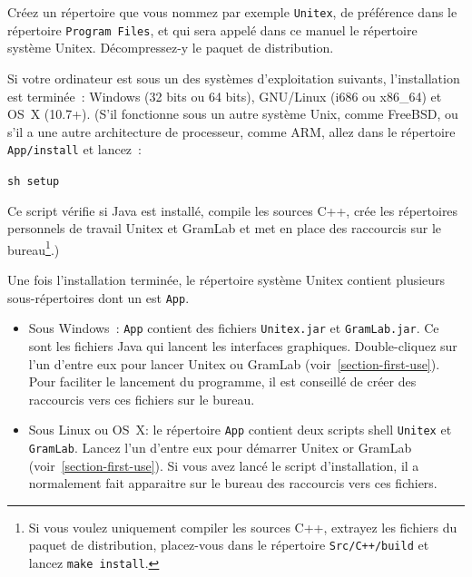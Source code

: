 \noindent  Créez un répertoire que vous nommez par exemple {\tt Unitex\UnitexVersion{}},
de préférence dans le répertoire  \verb+Program Files+, et qui sera appelé dans ce manuel
le répertoire système Unitex. Décompressez-y le paquet de distribution.

\bigskip
\noindent Si votre ordinateur est sous un des systèmes d'exploitation suivants, l'installation est terminée~:
Windows (32 bits ou 64 bits), GNU/Linux (i686 ou x86\_64) et OS~X (10.7+). (S'il fonctionne sous un autre système Unix, comme
FreeBSD, ou s'il a une autre architecture de processeur, comme ARM, allez dans le répertoire \verb+App/install+ et lancez~:

\begin{flushleft}
\verb+sh setup+
\end{flushleft}

\noindent Ce script vérifie si Java est installé, compile les sources C++, crée les répertoires personnels de travail
Unitex et GramLab et met en place des raccourcis sur le bureau\footnote{ Si vous voulez uniquement compiler les sources C++,
extrayez les fichiers du paquet de distribution, placez-vous dans le répertoire {\tt Src/C++/build} et lancez {\tt make install}.}.)

\bigskip
\noindent Une fois l'installation terminée, le répertoire système Unitex contient plusieurs
sous-répertoires dont un est \verb+App+.
\begin{itemize}
\item Sous Windows~: \verb+App+ contient des fichiers \verb+Unitex.jar+
et \verb+GramLab.jar+. Ce sont les fichiers Java qui lancent les interfaces graphiques. Double-cliquez sur l'un
d'entre eux pour lancer Unitex ou GramLab (voir~\ref{section-first-use}). Pour faciliter le lancement du programme,
il est conseillé de créer des raccourcis vers ces fichiers sur le bureau.
\item Sous Linux ou OS~X: le répertoire \verb+App+ contient deux scripts shell \verb+Unitex+
et \verb+GramLab+. Lancez l'un d'entre eux pour démarrer Unitex or GramLab (voir~\ref{section-first-use}). Si vous
avez lancé le script d'installation, il a normalement fait apparaitre sur le bureau des raccourcis vers ces fichiers.
\end{itemize}



